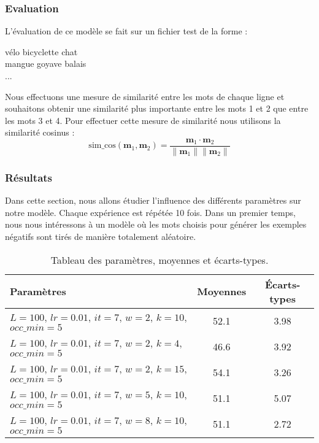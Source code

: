 \documentclass[12pt]{article}
\begin{document}
\subsubsection{Evaluation}
L'évaluation de ce modèle se fait sur un fichier test de la forme :
\begin{center}
vélo bicyclette chat\\
mangue goyave balais\\
...\\
\end{center}
Nous effectuons une mesure de similarité entre les mots de chaque ligne et souhaitons obtenir
une similarité plus importante entre les mots 1 et 2 que entre les mots 3 et 4. Pour effectuer cette mesure de 
similarité nous utilisons la similarité cosinus :
\[
\text{sim\_cos}(\mathbf{m}_1, \mathbf{m}_2) = \frac{\mathbf{m}_1 \cdot \mathbf{m}_2}{\|\mathbf{m}_1\| \|\mathbf{m}_2\|}
\]


\subsubsection{Résultats}

Dans cette section, nous allons étudier l'influence des différents paramètres sur notre modèle. 
Chaque expérience est répétée 10 fois. 
Dans un premier temps, nous nous intéressons à un modèle où les mots choisis pour générer les exemples négatifs sont tirés de manière totalement aléatoire.
\newline
\newline

\begin{table}[h!]
    \centering
    \begin{tabularx}{\textwidth}{|X|c|c|}
        \hline
        \textbf{Paramètres} & \textbf{Moyennes} & \textbf{Écarts-types} \\ 
        \hline
        $L=100$, $lr=0.01$, $it=7$, $w=2$, $k=10$, $occ\_min=5$ & 52.1 & 3.98 \\ 
        \hline
        $L=100$, $lr=0.01$, $it=7$, $w=2$, $k=4$, $occ\_min=5$ & 46.6 & 3.92 \\ 
        \hline
        $L=100$, $lr=0.01$, $it=7$, $w=2$, $k=15$, $occ\_min=5$ & 54.1 & 3.26 \\ 
        \hline
        $L=100$, $lr=0.01$, $it=7$, $w=5$, $k=10$, $occ\_min=5$ & 51.1 & 5.07 \\ 
        \hline
        $L=100$, $lr=0.01$, $it=7$, $w=8$, $k=10$, $occ\_min=5$ & 51.1 & 2.72 \\ 
        \hline
    \end{tabularx}
    \caption{Tableau des paramètres, moyennes et écarts-types.}
    \label{tab:parametres_moyennes}
\end{table}
\end{document}
